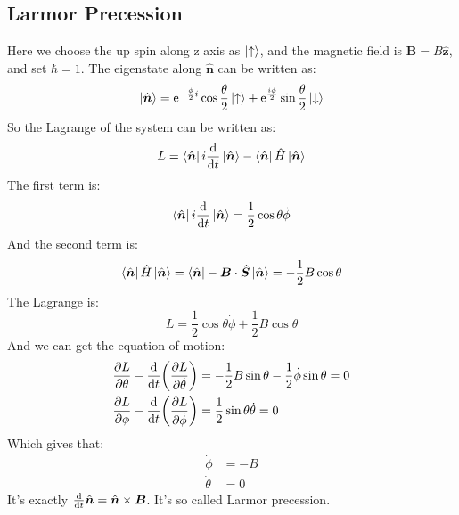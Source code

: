 \documentclass[../main.tex]{subfiles}
\begin{document}
\subsection{Larmor Precession}
Here we choose the up spin along z axis as $\ket{\uparrow}$, and the magnetic field is $\bm{B} = B\hat{\bm{z}}$, and set $\hbar = 1$. The eigenstate along $\hat{\bm{n}}$ can be written as:
\begin{equation}
    \ket{\hat{\bm{n}}} = \textrm{e}^{-\frac{\phi}{2}i}\cos\frac{\theta}{2}\ket{\uparrow} + \textrm{e}^{\frac{i\phi}{2}}\sin\frac{\theta}{2}\ket{\downarrow}
\end{equation}
So the Lagrange of the system can be written as:
\begin{equation}
    L = \bra{\hat{\bm{n}}}i\dv{t} \ket{\hat{\bm{n}}} - \bra{\hat{\bm{n}}}\hat{H}\ket{\hat{\bm{n}}}
\end{equation}
The first term is:
\begin{equation}
    \bra{\hat{\bm{n}}}i\dv{t} \ket{\hat{\bm{n}}} = \frac{1}{2}\cos\theta\dot{\phi}
\end{equation}
And the second term is:
\begin{equation}
    \bra{\hat{\bm{n}}}\hat{H}\ket{\hat{\bm{n}}} = \bra{\hat{\bm{n}}}-\bm{B}\cdot\hat{\bm{S}}\ket{\hat{\bm{n}}} = -\frac{1}{2}B\cos\theta
\end{equation}
The Lagrange is:
\begin{equation}
    L = \frac{1}{2}\cos\theta\dot{\phi} + \frac{1}{2}B\cos\theta
\end{equation} 
And we can get the equation of motion:
\begin{align}
    \pdv{L}{\theta} - \dv{t}(\pdv{L}{\dot{\theta}}) &= -\frac{1}{2}B\sin\theta - \frac{1}{2}\dot{\phi}\sin\theta = 0\\
    \pdv{L}{\phi} - \dv{t}(\pdv{L}{\dot{\phi}}) &= \frac{1}{2}\sin\theta\dot{\theta} = 0
\end{align}
Which gives that:
\begin{align}
    \dot{\phi} &= -B\\
    \dot{\theta} &= 0
\end{align}
It's exactly $\dv{t}\hat{\bm{n}} = \hat{\bm{n}} \times \bm{B}$. It's so called Larmor precession.
\end{document}
